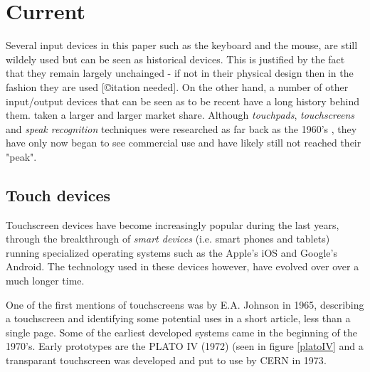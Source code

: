 \section{Current}


Several input devices in this paper such as the keyboard and the mouse, are still wildely used but can be seen as historical devices. This is justified by the fact that they remain largely unchainged - if not in their physical design then in the fashion they are used [©itation needed]. On the other hand, a number of other input/output devices that can be seen as to be recent have a long history behind them. taken a larger and larger market share. Although \emph{touchpads}, \emph{touchscreens} and \emph{speak recognition} techniques were researched as far back as the 1960's \cite{buxton}\cite{shoebox}, they have only now began to see commercial use and have likely still not reached their "peak". 


\subsection{Touch devices}
Touchscreen devices have become increasingly popular during the last years, through the breakthrough of \emph{smart devices} (i.e. smart phones and tablets) running specialized operating systems such as the Apple's iOS and Google's Android. The technology used in these devices however, have evolved over over a much longer time.

One of the first mentions of touchscreens was by E.A. Johnson in 1965, describing a touchscreen and identifying some potential uses in a short article, less than a single page\cite{4205802}. Some of the earliest developed systems came in the beginning of the 1970's. Early prototypes are the PLATO IV\cite{buxton} (1972) (seen in figure \ref{platoIV} and a transparant touchscreen was developed and put to use by CERN in 1973\cite{cern}.


